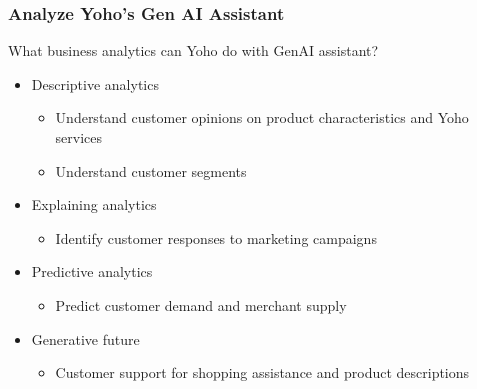 \subsubsection{Analyze Yoho’s Gen AI Assistant}
What business analytics can Yoho do with GenAI assistant?
\begin{itemize}
    \item Descriptive analytics
          \begin{itemize}
              \item Understand customer opinions on product characteristics and Yoho services
              \item Understand customer segments
          \end{itemize}
    \item Explaining analytics
          \begin{itemize}
              \item Identify customer responses to marketing campaigns
          \end{itemize}
    \item Predictive analytics
          \begin{itemize}
              \item Predict customer demand and merchant supply
          \end{itemize}
    \item Generative future
          \begin{itemize}
              \item Customer support for shopping assistance and product descriptions
          \end{itemize}
\end{itemize}
